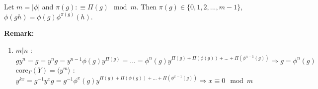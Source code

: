 \documentclass[a4paper,11pt]{article}
\begin{document}
Let $m=|\phi|$ and $\pi(g):\equiv\Pi(g)\mod m$. Then $\pi(g)\in\{0,1,2,...,m-1\}$, $\phi(gh)=\phi(g)\phi^{\pi(g)}(h)$.

\noindent\textbf{Remark:}
\begin{enumerate}
	\item $m|n$ : {$gy^n=g=y^ng=y^{n-1}\phi(g)y^{\Pi(g)}=...=\phi^n(g)y^{\Pi(g)+\Pi(\phi(g))+...+\Pi(\phi^{n-1}(g))}\Rightarrow g=\phi^n(g)$} \\
		  $\mathrm{core}_\Gamma(Y)=\langle y^m\rangle$ :
		{$y^{kx}=g^{-1}y^xg=g^{-1}\phi^{x}(g)y^{\Pi(g)+\Pi(\phi(g))+...+\Pi(\phi^{x-1}(g))}\Rightarrow x\equiv 0\mod m$}
\end{enumerate}
\end{document}
